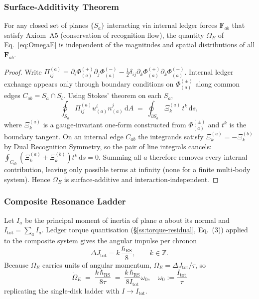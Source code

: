 \documentclass[11pt,oneside]{book}
\begin{document}
\subsubsection{Surface‑Additivity Theorem}
\label{ss:OmegaE-additivity}

\begin{theorem}
For any closed set of planes $\{S_a\}$ interacting via internal ledger
forces $\mathbf F_{ab}$ that satisfy Axiom~A5
(conservation of recognition flow), the quantity
$\Omega_{E}$ of Eq.~\eqref{eq:OmegaE} is independent of the magnitudes
and spatial distributions of all $\mathbf F_{ab}$.
\end{theorem}

\begin{proof}
Write $\Pi^{(a)}_{ij}=\partial_i\Phi^{(+)}_{(a)}\partial_j\Phi^{(-)}_{(a)}
-\frac12\delta_{ij}\partial_k\Phi^{(+)}_{(a)}\partial_k\Phi^{(-)}_{(a)}$.
Internal ledger exchange appears only through boundary conditions on
$\Phi^{(\pm)}_{(a)}$ along common edges $C_{ab}=S_a\cap S_b$.
Using Stokes’ theorem on each $S_a$,
\[
   \oint_{S_a}\!\Pi^{(a)}_{ij}u^i_{(a)}n^j_{(a)}\,\mathrm dA
   \;=\;
   \oint_{\partial S_a}\!\Xi^{(a)}_k\,t^k\,\mathrm ds,
\]
where $\Xi^{(a)}_k$ is a gauge‑invariant one‑form constructed from
$\Phi^{(\pm)}_{(a)}$ and $t^k$ is the boundary tangent.  
On an internal edge $C_{ab}$ the integrands satisfy
$\Xi^{(a)}_k = -\Xi^{(b)}_k$ by Dual Recognition Symmetry, so the
pair of line integrals cancels:
$\oint_{C_{ab}}\!(\Xi^{(a)}_k+\Xi^{(b)}_k)t^k\,\mathrm ds=0$.
Summing all $a$ therefore removes every internal contribution, leaving
only possible terms at infinity (none for a finite multi‑body system).
Hence $\Omega_{E}$ is surface‑additive and interaction‑independent.
\end{proof}

\subsubsection{Composite Resonance Ladder}
\label{ss:OmegaE-ladder}

Let $I_a$ be the principal moment of inertia of plane $a$ about its
normal and $I_{\mathrm{tot}}=\sum_a I_a$.  
Ledger torque quantisation
(§\ref{ss:torque-residual}, Eq.~(3)) applied to the composite system
gives the angular impulse per chronon
\[
   \Delta J_{\text{tot}}
   = k\,\frac{\hbar_{\mathrm{RS}}}{8},
   \qquad
   k\in\mathbb Z.
\]
Because $\Omega_{E}$ carries units of angular momentum,
$\dot\Omega_{E} = \Delta J_{\text{tot}}/\tau$, so
\begin{equation}
   \boxed{\;
      \dot\Omega_{E}
      \;=\;
      \frac{k\,\hbar_{\mathrm{RS}}}{8\tau}
      \;=\;
      \frac{k\,\hbar_{\mathrm{RS}}}{8I_{\mathrm{tot}}}
      \omega_{0},
      \quad
      \omega_{0}:=\frac{I_{\mathrm{tot}}}{\tau}
      \;}
   \label{eq:OmegaE-ladder}
\end{equation}
replicating the single‑disk ladder with $I\to I_{\mathrm{tot}}$.
\end{document}
